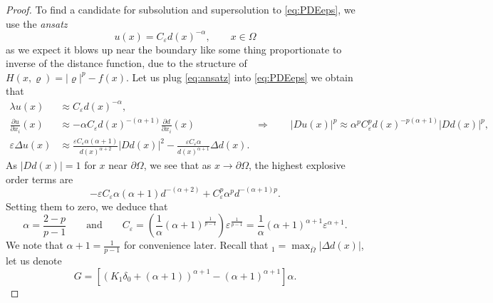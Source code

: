 \documentclass[11pt,reqno]{amsart}
\numberwithin{figure}{section}
\theoremstyle{plain}
\theoremstyle{remark}
\numberwithin{equation}{section}
\begin{document}
\begin{proof} 

\noindent To find a candidate for subsolution and supersolution to \eqref{eq:PDEeps}, we use the \emph{ansatz}
\begin{equation}\label{eq:ansatz}
    u(x) = C_\varepsilon d(x)^{-\alpha}, \qquad x\in \Omega
\end{equation}
as we expect it blows up near the boundary like some thing proportionate to inverse of the distance function, due to the structure of $H(x,\varrho) = |\varrho|^p - f(x)$. Let us plug \eqref{eq:ansatz} into \eqref{eq:PDEeps} we obtain that 
\begin{align*}
    \lambda u(x) &\approx C_\varepsilon d(x)^{-\alpha},\\
    \frac{\partial u}{\partial x_i}(x) &\approx -\alpha C_\varepsilon d(x)^{-(\alpha+1)} \frac{\partial d}{\partial x_i}(x) \qquad\qquad\qquad \Longrightarrow\qquad |Du (x)|^p \approx \alpha^p C_\varepsilon^p d(x)^{-p(\alpha+1)}|D d(x)|^p,\\
    \varepsilon\Delta u(x) &\approx \frac{\varepsilon C_\varepsilon\alpha(\alpha+1)}{d(x)^{\alpha+2}}|D d(x)|^2 - \frac{\varepsilon C_\varepsilon\alpha}{d(x)^{\alpha+1}}\Delta d(x).
\end{align*}
As $|D d(x)| = 1$ for $x$ near $\partial\Omega$, we see that as $x\to \partial \Omega$, the highest explosive order terms are
\begin{equation*}
        -\varepsilon C_\varepsilon \alpha(\alpha+1)d^{-(\alpha+2)} + C_\varepsilon^p \alpha^p d^{-(\alpha+1)p}.
\end{equation*}
Setting them to zero, we deduce that
\begin{equation}\label{e:relation}
    \displaystyle\alpha = \frac{2-p}{p-1} \qquad\text{and}\qquad C_\varepsilon = \left(\frac{1}{\alpha}(\alpha+1)^\frac{1}{p-1}\right) \varepsilon^{\frac{1}{p-1}} = \frac{1}{\alpha}(\alpha+1)^{\alpha+1}\varepsilon^{\alpha+1}.
\end{equation}
We note that $\alpha+1 = \frac{1}{p-1}$ for convenience later. Recall that $_1 = \max_{\overline{\Omega}}|\Delta d(x)|$, let us denote
\begin{equation*}
    G = \left[\left(K_1\delta_0+(\alpha+1)\right)^{\alpha+1} - (\alpha+1)^{\alpha+1}\right]\alpha.
\end{equation*}


\end{proof}
\end{document}
